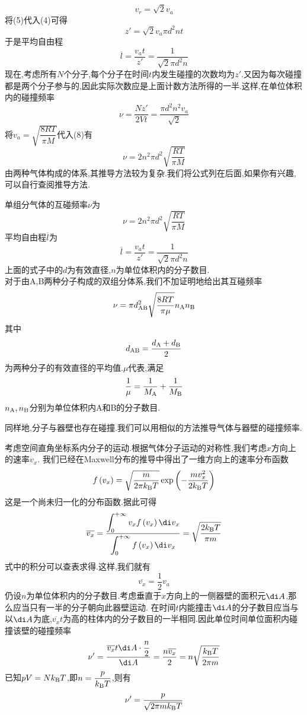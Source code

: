 \documentclass{ctexart}
\begin{document}
\begin{derivation}
\begin{equation}
        v_r=\sqrt{2}v_a
    \end{equation}
    将(5)代入(4)可得
    \begin{equation}
        z'=\sqrt2v_a\pi d^2nt
    \end{equation}
    于是平均自由程
    \begin{equation}
        \overline{l}=\dfrac{v_at}{z'}=\dfrac{1}{\sqrt2\pi d^2n}
    \end{equation}
    现在,考虑所有$N$个分子,每个分子在时间$t$内发生碰撞的次数均为$z'$.又因为每次碰撞都是两个分子参与的,因此实际次数应是上面计数方法所得的一半.这样,在单位体积内的碰撞频率
    \begin{equation}
        \nu=\dfrac{Nz'}{2Vt}=\dfrac{\pi d^2n^2v_a}{\sqrt2}
    \end{equation}
    将$v_a=\sqrt{\dfrac{8RT}{\pi M}}$代入(8)有
    \begin{equation}
        \nu=2n^2\pi d^2\sqrt{\dfrac{RT}{\pi M}}
    \end{equation}
    由两种气体构成的体系,其推导方法较为复杂.我们将公式列在后面,如果你有兴趣,可以自行查阅推导方法.
\end{derivation}\setcounter{equation}{0}
\begin{theorem}[1B.4.3 气体分子的互碰频率与平均自由程]
    单组分气体的互碰频率$\nu$为
    \[\nu=2n^2\pi d^2\sqrt{\dfrac{RT}{\pi M}}\]
    平均自由程$\overline{l}$为
    \[\overline{l}=\dfrac{v_at}{z'}=\dfrac{1}{\sqrt2\pi d^2n}\]
    上面的式子中的$d$为有效直径,$n$为单位体积内的分子数目.\\
    对于由A,B两种分子构成的双组分体系,我们不加证明地给出其互碰频率
    \[\nu=\pi d_{\text{AB}}^2\sqrt{\dfrac{8RT}{\pi\mu}}n_\text An_\text B\]
    其中
    \[d_{\text{AB}}=\dfrac{d_\text A+d_\text B}{2}\]
    为两种分子的有效直径的平均值.$\mu$代表,满足
    \[\dfrac1\mu=\dfrac{1}{M_\text A}+\dfrac{1}{M_\text B}\]
    $n_\text A,n_\text B$分别为单位体积内A和B的分子数目.
\end{theorem}
同样地,分子与器壁也存在碰撞.我们可以用相似的方法推导气体与器壁的碰撞频率.
\begin{derivation}
    考虑空间直角坐标系内分子的运动.根据气体分子运动的对称性,我们考虑$x$方向上的速率$v_x$.%
    我们已经在Maxwell分布的推导中得出了一维方向上的速率分布函数
    \[f\left(v_x\right)=\sqrt{\dfrac{m}{2\pi k_\text BT}}\exp\left(-\dfrac{mv_x^2}{2k_\text BT}\right)\]
    这是一个尚未归一化的分布函数.据此可得
    \[\overline{v_x}=\dfrac{\displaystyle\int_0^{+\infty}v_xf\left(v_x\right)\di v_x}{\displaystyle\int_0^{+\infty}f\left(v_x\right)\di v_x}=\sqrt{\dfrac{2k_\text BT}{\pi m}}\]
    式中的积分可以查表求得.这样,我们就有
    \[\overline{v_x}=\dfrac12v_a\]
    仍设$n$为单位体积内的分子数目.考虑垂直于$x$方向上的一侧器壁的面积元$\di A$,那么应当只有一半的分子朝向此器壁运动.%
    在时间$t$内能撞击$\di A$的分子数目应当与以$\di A$为底,$\overline{v_x}t$为高的柱体内的分子数目的一半相同.因此单位时间单位面积内碰撞该壁的碰撞频率
    \[\nu'=\dfrac{\overline{v_x}t\di A\cdot\dfrac n2}{\di A}=\dfrac{n\overline{v_x}}{2}=n\sqrt{\dfrac{k_\text BT}{2\pi m}}\]
    已知$pV=Nk_\text BT$,即$n=\dfrac{p}{k_\text BT}$,则有
    \[\nu'=\dfrac{p}{\sqrt{2\pi mk_\text BT}}\]
    
\end{derivation}
\end{document}
